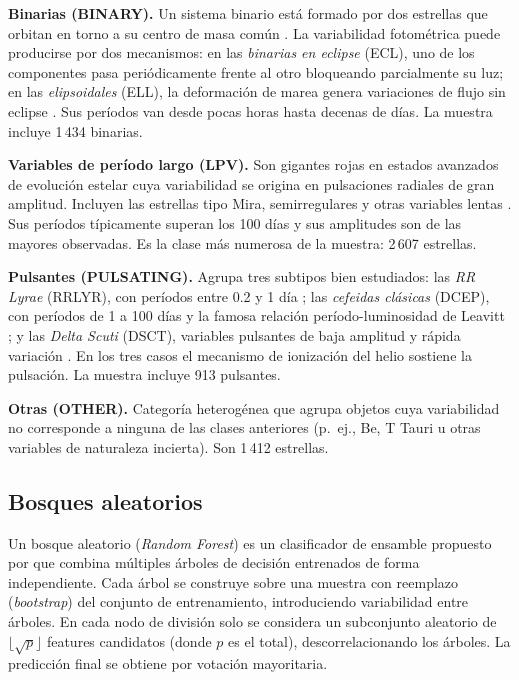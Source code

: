 \documentclass[letterpaper,12pt]{extarticle}
\begin{document}
\textbf{Binarias (BINARY).} Un sistema binario está formado por dos estrellas que
orbitan en torno a su centro de masa común \citep{Karttunen2016}. La variabilidad
fotométrica puede producirse por dos mecanismos: en las \textit{binarias en eclipse}
(ECL), uno de los componentes pasa periódicamente frente al otro bloqueando
parcialmente su luz; en las \textit{elipsoidales} (ELL), la deformación de marea
genera variaciones de flujo sin eclipse \citep{pawlak2016, Soszynski2016}. Sus
períodos van desde pocas horas hasta decenas de días. La muestra incluye
1\,434 binarias.

\textbf{Variables de período largo (LPV).} Son gigantes rojas en estados avanzados
de evolución estelar cuya variabilidad se origina en pulsaciones radiales de gran
amplitud. Incluyen las estrellas tipo Mira, semirregulares y otras variables lentas
\citep{mattei1997, soszynski2009lpv}. Sus períodos típicamente superan los 100 días
y sus amplitudes son de las mayores observadas. Es la clase más numerosa de la
muestra: 2\,607 estrellas.

\textbf{Pulsantes (PULSATING).} Agrupa tres subtipos bien estudiados: las
\textit{RR Lyrae} (RRLYR), con períodos entre 0.2 y 1 día \citep{Soszynski2009};
las \textit{cefeidas clásicas} (DCEP), con períodos de 1 a 100 días y la famosa
relación período-luminosidad de Leavitt \citep{Soszynski2008}; y las \textit{Delta
Scuti} (DSCT), variables pulsantes de baja amplitud y rápida variación
\citep{Pietrukowicz2013}. En los tres casos el mecanismo de ionización del helio
sostiene la pulsación. La muestra incluye 913 pulsantes.

\textbf{Otras (OTHER).} Categoría heterogénea que agrupa objetos cuya variabilidad
no corresponde a ninguna de las clases anteriores (p.~ej., Be, T Tauri u otras
variables de naturaleza incierta). Son 1\,412 estrellas.

\subsection{Bosques aleatorios}

Un bosque aleatorio (\textit{Random Forest}) es un clasificador de ensamble
propuesto por \citet{breiman2001} que combina múltiples árboles de decisión
entrenados de forma independiente. Cada árbol se construye sobre una muestra con
reemplazo (\textit{bootstrap}) del conjunto de entrenamiento, introduciendo
variabilidad entre árboles. En cada nodo de división solo se considera un
subconjunto aleatorio de $\lfloor\sqrt{p}\rfloor$ features candidatos (donde $p$
es el total), descorrelacionando los árboles. La predicción final se obtiene por
votación mayoritaria.
\end{document}
